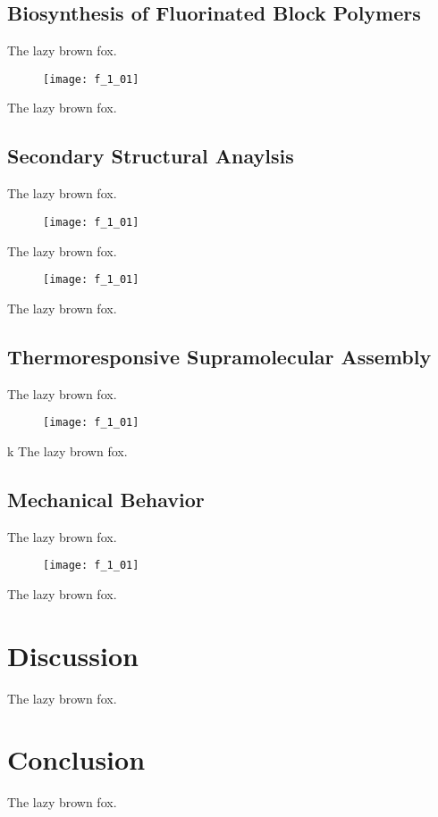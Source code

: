 \begin{refsection}
\subsection{Biosynthesis of Fluorinated Block Polymers}

The lazy brown fox.

\begin{figure}[h!]
    \centering
    \texttt{[image: f\_1\_01]}
    \caption{}
    \label{fig:biosynthesis_report}
\end{figure}

The lazy brown fox.

\subsection{Secondary Structural Anaylsis}

The lazy brown fox.

\begin{figure}[h!]
    \centering
    \texttt{[image: f\_1\_01]}
    \caption{}
    \label{fig:CD_temp_wl}
\end{figure}

The lazy brown fox.

\begin{figure}[h!]
    \centering
    \texttt{[image: f\_1\_01]}
    \caption{}
    \label{fig:CD_computation}
\end{figure}

The lazy brown fox.

\subsection{Thermoresponsive Supramolecular Assembly}

The lazy brown fox.

\begin{figure}[h!]
    \centering
    \texttt{[image: f\_1\_01]}
    \caption{}
    \label{fig:lcst}
\end{figure}
k
The lazy brown fox.

\subsection{Mechanical Behavior}

The lazy brown fox.

\begin{figure}[h!]
    \centering
    \texttt{[image: f\_1\_01]}
    \caption{}
    \label{fig:rheology}
\end{figure}

The lazy brown fox.

\section{Discussion}

The lazy brown fox.

\section{Conclusion}

The lazy brown fox.

\printbibliography[heading=subbibliography]

\end{refsection}
